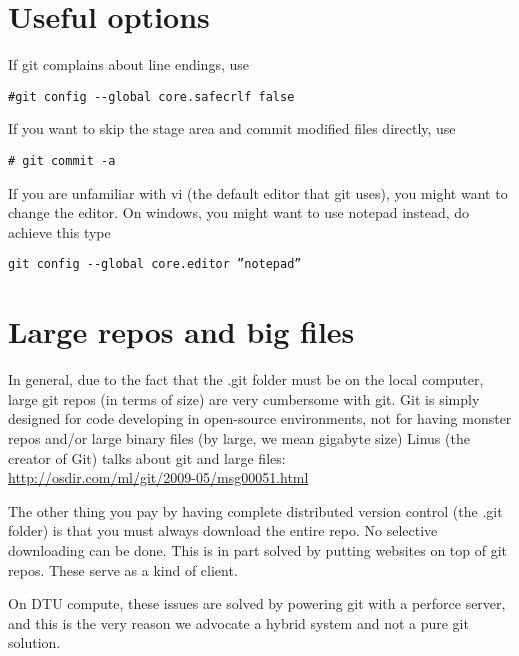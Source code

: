 \documentclass[10pt,a4paper]{article}
\begin{document}
\section{Useful options}
If git complains about line endings, use
\begin{lstlisting}
#git config --global core.safecrlf false
\end{lstlisting}
If you want to skip the stage area and commit modified files directly, use
\begin{lstlisting}
# git commit -a 
\end{lstlisting}
If you are unfamiliar with vi (the default editor that git uses), you might want to change the editor. On windows, you might want to use notepad instead, do achieve this type 
\begin{lstlisting}
git config --global core.editor ”notepad”
\end{lstlisting}

\section{Large repos and big files}
In general, due to the fact that the .git folder must be on the local computer, large git repos (in terms of size) are very cumbersome with git. Git is simply designed for code developing in open-source environments, not for having monster repos and/or large binary files (by large, we mean gigabyte size)
Linus (the creator of Git) talks about git and large files:\\
\url{http://osdir.com/ml/git/2009-05/msg00051.html}

The other thing you pay by having complete distributed version control (the .git folder) is that you must always download the entire repo. No selective downloading can be done. This is in part solved by putting websites on top of git repos. These serve as a kind of client.

On DTU compute, these issues are solved by powering git with a perforce server, and this is the very reason we advocate a hybrid system and not a pure git solution.
\end{document}
